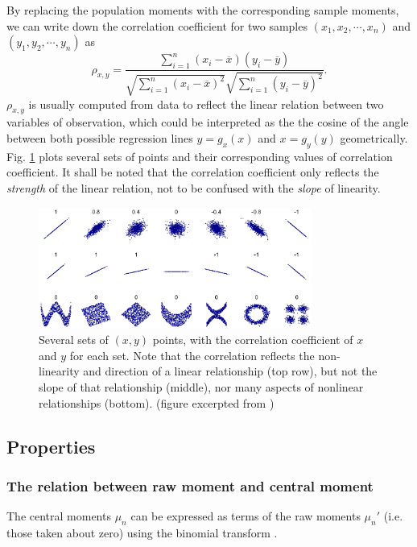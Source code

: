By replacing the population moments with the corresponding sample moments, we can write down the correlation coefficient for two samples $ (x_1, x_2, \cdots, x_n) $ and $ (y_1, y_2, \cdots, y_n) $ as 
\begin{equation}
\rho_{x,y} = \frac{\sum_{i=1}^{n} (x_i - \overline{x})(y_i - \overline{y})}{\sqrt{\sum_{i=1}^n(x_i-\overline{x})^2} \sqrt{\sum_{i=1}^n (y_i - \overline{y})^2} }.
\end{equation}
$ \rho_{x,y} $ is usually computed from data to reflect the linear relation between two variables of observation, which could be interpreted as the the cosine of the angle between both possible regression lines $ y=g_x(x) $  and $ x=g_y(y) $ geometrically. Fig. \ref{fig:ch1_corr_ex} plots several sets of points and their corresponding values of correlation coefficient. It shall be noted that the correlation coefficient only reflects the \textit{strength} of the linear relation, not to be confused with the \textit{slope} of linearity.

\begin{figure}[htbp]
\begin{center}
\includegraphics[width=0.8\textwidth]{figures/ch1_correlation.eps}
\caption{Several sets of $ (x,y) $  points, with the correlation coefficient of $ x $  and $ y $  for each set. Note that the correlation reflects the non-linearity and direction of a linear relationship (top row), but not the slope of that relationship (middle), nor many aspects of nonlinear relationships (bottom). (figure excerpted from \cite{www-wiki-corr})}
\label{fig:ch1_corr_ex}
\end{center}
\end{figure}


\subsection{Properties}


\subsubsection{The relation between raw moment and central moment}
The central moments $ \mu_n $  can be expressed as terms of the raw moments $ \mu_n' $ (i.e. those taken about zero) using the binomial transform \cite{papoulis2002probability}. 

